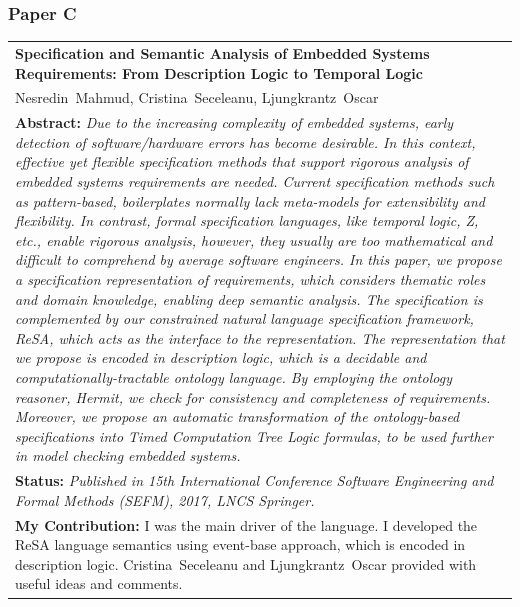 \subsubsection{Paper C}
\begin{tabular}{p{\textwidth}}
\textbf{Specification and Semantic Analysis of Embedded Systems Requirements: From  Description Logic to Temporal Logic}\\%
Nesredin~Mahmud, Cristina~Seceleanu, Ljungkrantz~Oscar\\[6pt]%
\textbf{Abstract:} \textit{Due to the increasing complexity of embedded systems, early detection of software/hardware errors has become desirable. In this context, effective yet flexible specification methods that support rigorous analysis of embedded systems requirements are needed. Current specification methods such as pattern-based, boilerplates normally lack meta-models for extensibility and flexibility. In contrast, formal specification languages, like temporal logic, Z, etc., enable rigorous analysis, however, they usually are too mathematical and difficult to comprehend by average software engineers. In this paper, we propose a specification representation of requirements, which considers thematic roles and domain knowledge, enabling deep semantic analysis. The specification is complemented by our constrained natural language specification framework, ReSA, which acts as the interface to the representation. The representation that we propose is encoded in description logic, which is a decidable and computationally-tractable ontology language. By employing the ontology reasoner, Hermit, we check for consistency and completeness of requirements. Moreover, we propose an automatic transformation of the ontology-based specifications into Timed Computation Tree Logic formulas, to be used further in model checking embedded systems.}\\[6pt]%
\textbf{Status:} \textit{Published in 15th International Conference Software Engineering and Formal Methods (SEFM), 2017, LNCS Springer.}\\%
\textbf{My Contribution: } I was the main driver of the language. I developed the ReSA language semantics using event-base approach, which is encoded in description logic. Cristina~Seceleanu and Ljungkrantz~Oscar provided with useful ideas and comments.\\%
\end{tabular}

